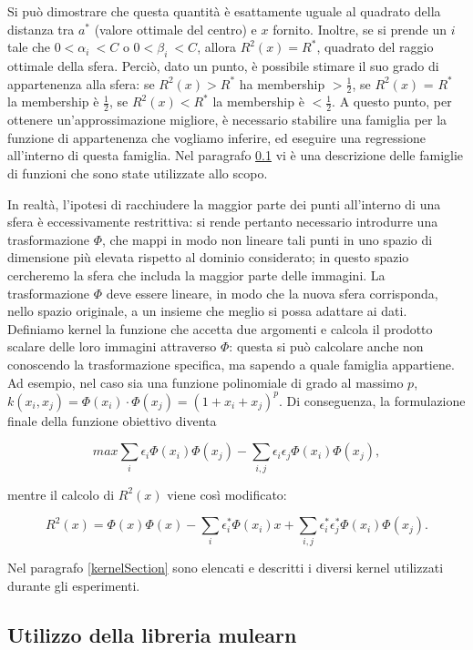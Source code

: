\documentclass[12pt,a4paper]{report}
\begin{document}
Si può dimostrare che questa quantità è esattamente uguale al quadrato della distanza tra $a^*$ (valore ottimale del centro) e $x$ fornito. Inoltre,  se si prende un $i$ tale che $0 < \alpha_{i}\ < C$ o $0 < \beta_{i}\ < C$,  allora $R^2(x) = R^*$, quadrato del raggio ottimale della sfera.
Perciò, dato un punto, è possibile stimare il suo grado di appartenenza alla sfera: se $R^2(x) > R^*$ ha membership $>\frac{1}{2}$, se $R^2(x)$ = $R^*$ la membership è  $\frac{1}{2}$, se $R^2(x)  < R^*$ la membership è  $< \frac{1}{2}$.
A questo punto, per ottenere un'approssimazione migliore, è necessario stabilire una famiglia per la funzione di appartenenza che vogliamo inferire, ed eseguire una regressione all'interno di questa famiglia. Nel paragrafo \ref{FuzzifierSection} vi è una descrizione delle famiglie di funzioni che sono state utilizzate allo scopo.

In realtà, l'ipotesi di racchiudere la maggior parte dei punti all'interno di una sfera è eccessivamente restrittiva: si rende pertanto necessario introdurre una trasformazione  $\Phi$, che mappi in modo non lineare tali punti in uno spazio di dimensione più elevata rispetto al dominio considerato; in questo spazio cercheremo la sfera che includa la maggior parte delle immagini.
La trasformazione $\Phi$ deve essere lineare, in modo che la nuova sfera corrisponda, nello spazio originale, a un insieme che meglio si possa adattare ai dati. Definiamo kernel la funzione che accetta due argomenti e calcola il prodotto scalare delle loro immagini attraverso $\Phi$: questa si può calcolare anche non conoscendo la trasformazione specifica, ma sapendo a quale famiglia appartiene. Ad esempio, nel caso sia una funzione polinomiale di grado al massimo $p$, $k(x_i, x_j) = \Phi(x_i)\cdot \Phi(x_j) = (1 + x_i + x_j)^p$.
Di conseguenza, la formulazione finale della funzione obiettivo diventa

\[ max \sum_{i}\epsilon_i\Phi(x_i)\Phi(x_j) - \sum_{i,j}\epsilon_i\epsilon_j\Phi(x_i)\Phi(x_j),\]

mentre il calcolo di $R^2(x)$ viene così modificato:

\[ R^2(x) = \Phi(x)\Phi(x) - \sum_{i}\epsilon_i^*\Phi(x_i)x + \sum_{i,j}\epsilon_i^*\epsilon_j^*\Phi(x_i)\Phi(x_j).\]

Nel paragrafo \ref{kernelSection} sono elencati e descritti i diversi kernel utilizzati durante gli esperimenti.

\subsection{Utilizzo della libreria mulearn}\label{FuzzifierSection}
\end{document}
